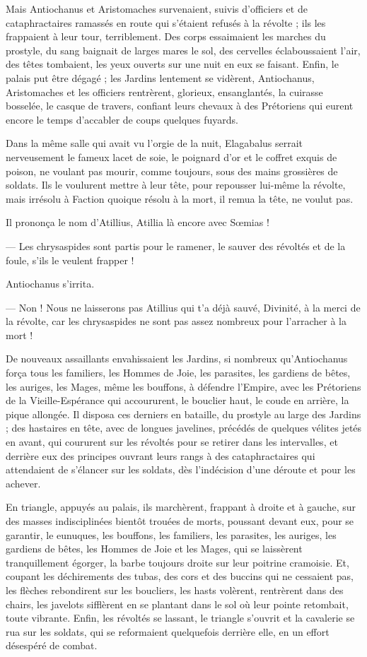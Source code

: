 \documentclass[a4paper, 11pt, oneside, polutonikogreek, french]{article}
\begin{document}
Mais Antiochanus et Aristomaches survenaient, suivis d'officiers et de cataphractaires ramassés en route qui s'étaient refusés à la révolte ; ils les frappaient à leur tour, terriblement. Des corps essaimaient les marches du prostyle, du sang baignait de larges mares le sol, des cervelles éclaboussaient l'air, des têtes tombaient, les yeux ouverts sur une nuit en eux se faisant. Enfin, le palais put être dégagé ; les Jardins lentement se vidèrent, Antiochanus, Aristomaches et les officiers rentrèrent, glorieux, ensanglantés, la cuirasse bosselée, le casque de travers, confiant leurs chevaux à des Prétoriens qui eurent encore le temps d'accabler de coups quelques fuyards.

Dans la même salle qui avait vu l'orgie de la nuit, Elagabalus serrait nerveusement le fameux lacet de soie, le poignard d'or et le coffret exquis de poison, ne voulant pas mourir, comme toujours, sous des mains grossières de soldats. Ils le voulurent mettre à leur tête, pour repousser lui-même la révolte, mais irrésolu à Faction quoique résolu à la mort, il remua la tête, ne voulut pas.

Il prononça le nom d'Atillius, Atillia là encore avec Sœmias !

--- Les chrysaspides sont partis pour le ramener, le sauver des révoltés et de la foule, s'ils le veulent frapper !

Antiochanus s'irrita.

--- Non ! Nous ne laisserons pas Atillius qui t'a déjà sauvé, Divinité, à la merci de la révolte, car les chrysaspides ne sont pas assez nombreux pour l'arracher à la mort !

De nouveaux assaillants envahissaient les Jardins, si nombreux qu'Antiochanus força tous les familiers, les Hommes de Joie, les parasites, les gardiens de bêtes, les auriges, les Mages, même les bouffons, à défendre l'Empire, avec les Prétoriens de la Vieille-Espérance qui accoururent, le bouclier haut, le coude en arrière, la pique allongée. Il disposa ces derniers en bataille, du prostyle au large des Jardins ; des hastaires en tête, avec de longues javelines, précédés de quelques vélites jetés en avant, qui coururent sur les révoltés pour se retirer dans les intervalles, et derrière eux des principes ouvrant leurs rangs à des cataphractaires qui attendaient de s'élancer sur les soldats, dès l'indécision d'une déroute et pour les achever.

En triangle, appuyés au palais, ils marchèrent, frappant à droite et à gauche, sur des masses indisciplinées bientôt trouées de morts, poussant devant eux, pour se garantir, le eunuques, les bouffons, les familiers, les parasites, les auriges, les gardiens de bêtes, les Hommes de Joie et les Mages, qui se laissèrent tranquillement égorger, la barbe toujours droite sur leur poitrine cramoisie. Et, coupant les déchirements des tubas, des cors et des buccins qui ne cessaient pas, les flèches rebondirent sur les boucliers, les hasts volèrent, rentrèrent dans des chairs, les javelots sifflèrent en se plantant dans le sol où leur pointe retombait, toute vibrante. Enfin, les révoltés se lassant, le triangle s'ouvrit et la cavalerie se rua sur les soldats, qui se reformaient quelquefois derrière elle, en un effort désespéré de combat.
\end{document}
